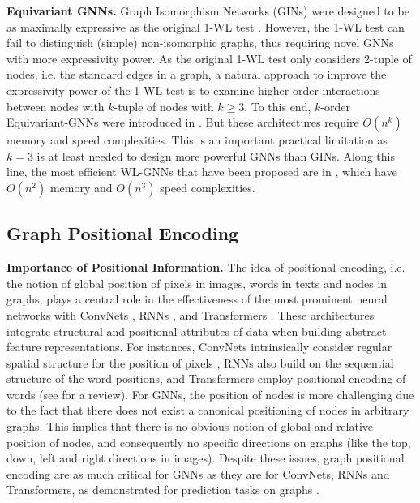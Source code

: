 \documentclass{article} \usepackage{iclr2021_conference,times}
\begin{document}
{\bf Equivariant GNNs.} Graph Isomorphism Networks (GINs) \citep{xu2018how} were designed to be as maximally expressive as the original 1-WL test \citep{weisfeiler1968reduction}. However, the 1-WL test can fail to distinguish (simple) non-isomorphic graphs, thus requiring novel GNNs with more expressivity power. As the original 1-WL test only considers 2-tuple of nodes, i.e. the standard edges in a graph, a natural approach to improve the expressivity power of the 1-WL test is to examine higher-order interactions between nodes with $k$-tuple of nodes with $k\geq 3$. To this end, $k$-order Equivariant-GNNs were introduced in \cite{maron2018invariant}. But these architectures require $O(n^k)$ memory and speed complexities. This is an important practical limitation as $k=3$ is at least needed to design more powerful GNNs than GINs. Along this line, the most efficient WL-GNNs that have been proposed are in \cite{maron2019provably,chen2019equivalence,azizian2020expressive}, which have $O(n^2)$ memory and $O(n^3)$ speed complexities.






\subsection{Graph Positional Encoding}
\label{sec:related_work_graphpe}

{\bf Importance of Positional Information.} The idea of positional encoding, i.e. the notion of global position of pixels in images, words in texts and nodes in graphs, plays a central role in the effectiveness of the most prominent neural networks with ConvNets \citep{lecun1998gradient}, RNNs \citep{hochreiter1997long}, and Transformers \citep{vaswani2017attention}. These architectures integrate structural and positional attributes of data when building abstract feature representations. For instances, ConvNets intrinsically consider regular spatial structure for the position of pixels \citep{Islam2020How}, RNNs also build on the sequential structure of the word positions, and Transformers employ positional encoding of words (see \cite{dufter2021position} for a review). For GNNs, the position of nodes is more challenging due to the fact that there does not exist a canonical positioning of nodes in arbitrary graphs. This implies that there is no obvious notion of global and relative position of nodes, and consequently no specific directions on graphs (like the top, down, left and right directions in images). Despite these issues, graph positional encoding are as much critical for GNNs as they are for ConvNets, RNNs and Transformers, as demonstrated for prediction tasks on graphs \citep{srinivasan2019equivalence, cui2021positional}. 
\end{document}
